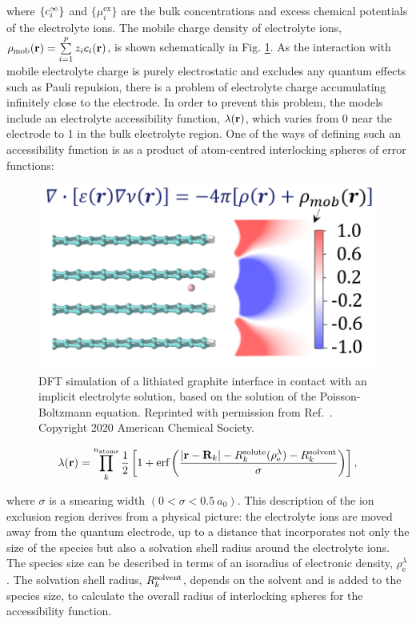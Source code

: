 \documentclass[../main.tex]{subfiles}
\begin{document}
where $\{c_i^{\infty}\}$ and $\{\mu_i^\textrm{ex}\}$ are the bulk concentrations and excess chemical potentials of the electrolyte ions. The mobile charge density of electrolyte ions, $\rho_{\textrm{mob}}\!\left(\mathbf{r}\right)=\sum\limits_{i=1}^p z_ic_i\!\left(\mathbf{r}\right)$, is shown schematically in Fig. \ref{fig:DFT+continuum}. As the interaction with mobile electrolyte charge is purely electrostatic and excludes any quantum effects such as Pauli repulsion, there is a problem of electrolyte charge accumulating infinitely close to the electrode. In order to prevent this problem, the models include an electrolyte accessibility function, $\lambda\!\left(\mathbf{r}\right)$, which varies from 0 near the electrode to 1 in the bulk electrolyte region.\cite{Fisicaro2017, Sundararaman2018, Stein2019} One of the ways of defining such an accessibility function is as a product of atom-centred interlocking spheres of error functions:\cite{Dziedzic2020}

\begin{figure}
    \centering
    \includegraphics[scale=0.7]{figures/DFT+Continuum.png}
    \caption{DFT simulation of a lithiated graphite interface in contact with an implicit electrolyte solution, based on the solution of the Poisson-Boltzmann equation. Reprinted with permission from Ref.~. Copyright 2020 American Chemical Society.}
    \label{fig:DFT+continuum}
\end{figure}

\begin{equation}
    \label{eq:access}
    \lambda\!\left(\mathbf{r}\right) = \prod\limits_{k}^{n_\textrm{atoms}}\frac{1}{2} \left[1+\textrm{erf}\left(\frac{|\textbf{r}-\textbf{R}_k|-R^{\rm solute}_k(\rho_{\textrm{e}}^\lambda)-R^{\rm solvent}_k}{\sigma}\right)\right],
\end{equation}

where $\sigma$ is a smearing width $(0<\sigma<0.5~a_0)$. This description of the ion exclusion region derives from a physical picture: the electrolyte ions are moved away from the quantum electrode, up to a distance that incorporates not only the size of the species but also a solvation shell radius around the electrolyte ions. The species size can be described in terms of an isoradius of electronic density, $\rho_{\textrm{e}}^\lambda$. The solvation shell radius, $R^{\rm solvent}_k$, depends on the solvent and is added to the species size, to calculate the overall radius of interlocking spheres for the accessibility function.
\end{document}
